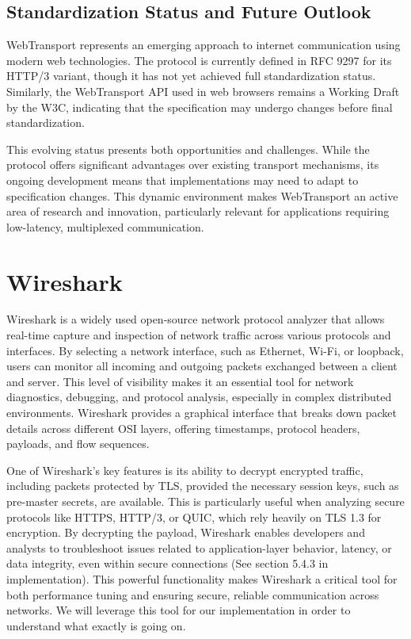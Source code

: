 \subsection{Standardization Status and Future Outlook}

WebTransport represents an emerging approach to internet communication using modern web technologies. The protocol is currently defined in RFC 9297 for its HTTP/3 variant, though it has not yet achieved full standardization status. Similarly, the WebTransport API used in web browsers remains a Working Draft by the W3C, indicating that the specification may undergo changes before final standardization.

This evolving status presents both opportunities and challenges. While the protocol offers significant advantages over existing transport mechanisms, its ongoing development means that implementations may need to adapt to specification changes. This dynamic environment makes WebTransport an active area of research and innovation, particularly relevant for applications requiring low-latency, multiplexed communication.


\section{Wireshark}

Wireshark is a widely used open-source network protocol analyzer that allows real-time capture and inspection of network traffic across various protocols and interfaces. By selecting a network interface, such as Ethernet, Wi-Fi, or loopback, users can monitor all incoming and outgoing packets exchanged between a client and server. This level of visibility makes it an essential tool for network diagnostics, debugging, and protocol analysis, especially in complex distributed environments. Wireshark provides a graphical interface that breaks down packet details across different OSI layers, offering timestamps, protocol headers, payloads, and flow sequences.

One of Wireshark’s key features is its ability to decrypt encrypted traffic, including packets protected by TLS, provided the necessary session keys, such as pre-master secrets, are available. This is particularly useful when analyzing secure protocols like HTTPS, HTTP/3, or QUIC, which rely heavily on TLS 1.3 for encryption. By decrypting the payload, Wireshark enables developers and analysts to troubleshoot issues related to application-layer behavior, latency, or data integrity, even within secure connections (See  section 5.4.3 in implementation). This powerful functionality makes Wireshark a critical tool for both performance tuning and ensuring secure, reliable communication across networks. We will leverage this tool for our implementation in order to understand what exactly is going on.


